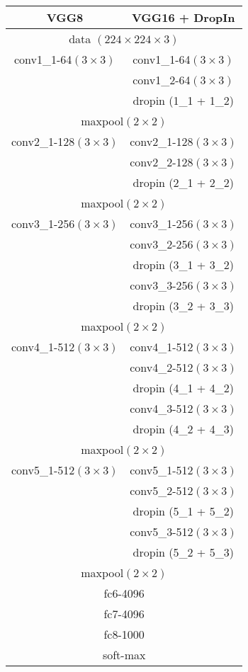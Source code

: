 \documentclass[10pt,twocolumn,letterpaper]{article}
\begin{document}
\begin{table}[htb]
  \vspace{-5pt}
\begin{center}
  \begin{tabular}{| c | c |}
    \hline
     VGG8 & VGG16 {\color{red}+ DropIn} \\ \hline
    
     \multicolumn{2}{|c|}{data $(224\times224\times3)$} \\ \hline
      conv1\_1-64$(3\times 3)$ & conv1\_1-64$(3\times 3)$ \\ 
      								& conv1\_2-64$(3\times 3)$ \\ 
      								& {\color{red}dropin (1\_1 + 1\_2)}\\ \hline
	\multicolumn{2}{|c|}{maxpool$(2\times2)$} \\ \hline
      conv2\_1-128$(3\times 3)$ & conv2\_1-128$(3\times 3)$ \\ 
      & conv2\_2-128$(3\times 3)$ \\  
      & {\color{red}dropin (2\_1 + 2\_2)}\\ \hline
\multicolumn{2}{|c|}{maxpool$(2\times2)$} \\ \hline
     conv3\_1-256$(3\times 3)$ & conv3\_1-256$(3\times 3)$ \\ 
     &conv3\_2-256$(3\times 3)$ \\
     &  {\color{red}dropin (3\_1 + 3\_2)}\\ 
     &			 conv3\_3-256$(3\times 3)$ \\
     &		  {\color{red}dropin (3\_2 + 3\_3)}\\ \hline 
\multicolumn{2}{|c|}{maxpool$(2\times2)$} \\ \hline
      conv4\_1-512$(3\times 3)$& conv4\_1-512$(3\times 3)$ \\ 
      &conv4\_2-512$(3\times 3)$ \\
      & {\color{red}dropin (4\_1 + 4\_2)}\\ 
     &			 conv4\_3-512$(3\times 3)$ \\ 
     &  {\color{red}dropin (4\_2 + 4\_3)}\\ \hline
\multicolumn{2}{|c|}{maxpool$(2\times2)$} \\ \hline
     conv5\_1-512$(3\times 3)$ & conv5\_1-512$(3\times 3)$ \\ 
     &conv5\_2-512$(3\times 3)$ \\
 &{\color{red}dropin (5\_1 + 5\_2)}\\ 
  &   			 conv5\_3-512$(3\times 3)$ \\ 
   &  			      {\color{red} dropin (5\_2 + 5\_3)}\\ \hline
\multicolumn{2}{|c|}{maxpool$(2\times2)$} \\ \hline
\multicolumn{2}{|c|}{fc6-4096} \\ \hline
\multicolumn{2}{|c|}{fc7-4096} \\ \hline
\multicolumn{2}{|c|}{fc8-1000} \\ \hline
\multicolumn{2}{|c|}{soft-max} \\ \hline
    

\end{tabular}
\end{center}
\end{table}
\end{document}
